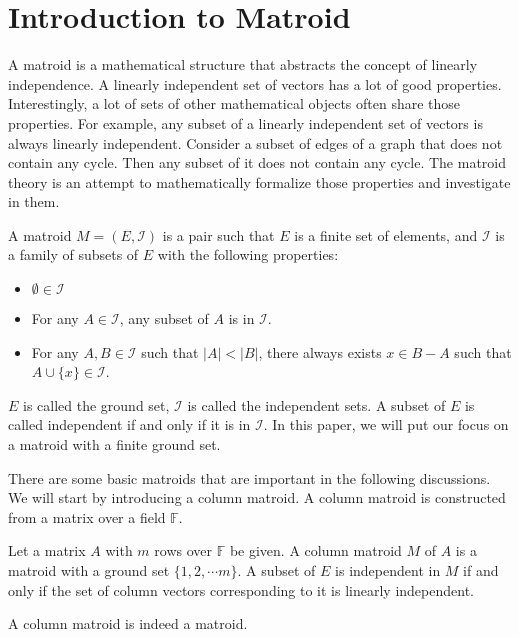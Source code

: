 \section{Introduction to Matroid}

A matroid is a mathematical structure that abstracts the concept of linearly independence.
A linearly independent set of vectors has a lot of good properties.
Interestingly, a lot of sets of other mathematical objects often share those properties.
For example, any subset of a linearly independent set of vectors is always linearly independent.
Consider a subset of edges of a graph that does not contain any cycle.
Then any subset of it does not contain any cycle.
The matroid theory is an attempt to mathematically formalize those properties and investigate in them.

\begin{defn}
A matroid $M = (E, \mathcal{I})$ is a pair such that $E$ is a finite set of elements, and $\mathcal{I}$ is a family of subsets of $E$ with the following properties:
\begin{itemize}
\item $\emptyset \in \mathcal{I}$
\item For any $A\in \mathcal{I}$, any subset of $A$ is in $\mathcal{I}$.
\item For any $A, B \in \mathcal{I}$ such that $\lvert A \rvert < \lvert B \rvert$, there always exists $x \in B - A$ such that $A \cup \{ x \} \in \mathcal{I}$.
\end{itemize}
\end{defn}
$E$ is called the ground set, $\mathcal{I}$ is called the independent sets. A subset of $E$ is called independent if and only if it is in $\mathcal{I}$.
In this paper, we will put our focus on a matroid with a finite ground set. 


There are some basic matroids that are important in the following discussions.
We will start by introducing a column matroid. 
A column matroid is constructed from a matrix over a field $\mathbb{F}$.

\begin{defn}
Let a matrix $A$ with $m$ rows over $\mathbb{F}$ be given.
A column matroid $M$ of $A$ is a matroid with a ground set $\{ 1, 2, \cdots m \}$.
A subset of $E$ is independent in $M$ if and only if the set of column vectors corresponding to it is linearly independent.
\end{defn}

\begin{thm}
A column matroid is indeed a matroid.
\end{thm}


